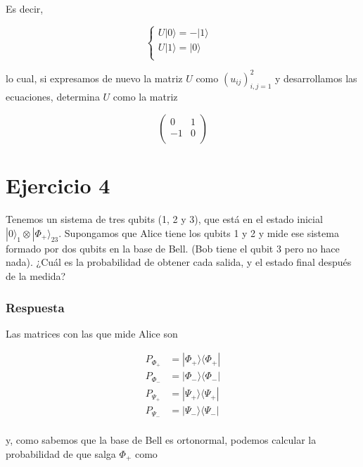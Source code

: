 \documentclass{article}
\begin{document}
Es decir,

$$
  \begin{cases}
    U|0\rangle = -|1\rangle &\\
    U|1\rangle = |0\rangle &\\
  \end{cases}
$$

lo cual, si expresamos de nuevo la matriz $U$ como 
$(u_{ij})_{i,j=1}^2$ y desarrollamos las ecuaciones, determina $U$ 
como la matriz

$$
\begin{pmatrix}
   0 & 1 \\ 
  -1 & 0 \\
\end{pmatrix}
$$

\section*{Ejercicio 4}

Tenemos un sistema de tres qubits (1, 2 y 3), que está en el 
estado inicial $|0\rangle_1 \otimes |\Phi_+\rangle_{23}$.
Supongamos que Alice tiene los qubits 1 y 2 y mide ese 
sistema formado por dos qubits en la base de Bell. (Bob tiene 
el qubit 3 pero no hace nada). ¿Cuál es la probabilidad de obtener 
cada salida, y el estado final después de la medida?

\subsubsection*{Respuesta}

Las matrices con las que mide Alice son 

\begin{align*}
  P_{\Phi_+} &= |\Phi_+\rangle\langle\Phi_+| \\
  P_{\Phi_-} &= |\Phi_-\rangle\langle\Phi_-| \\
  P_{\Psi_+} &= |\Psi_+\rangle\langle\Psi_+| \\
  P_{\Psi_-} &= |\Psi_-\rangle\langle\Psi_-| \\
\end{align*}

y, como sabemos que la base de Bell es ortonormal, podemos calcular
la probabilidad de que salga $\Phi_+$ como
\end{document}

